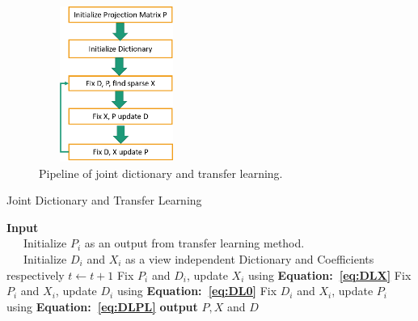 \begin{figure}[hbt!]
	\centering
	\includegraphics[width=2in,height=2in]{figures/novelpipeline}
	\linebreak
	\caption{Pipeline of joint dictionary and transfer learning.}
	\label{fig1:novelpipeline}
\end{figure}  
\begin{algorithm}
	\caption{Joint Dictionary and Transfer Learning}
	\begin{algorithmic}[1]
		\State \textbf{Input}\\
		~~~Initialize $P_i$ as an output from transfer learning method.\\
		~~~Initialize $D_i$ and $X_i$ as a view independent Dictionary and Coefficients respectively 
		\State $t \leftarrow t+1$
		\State Fix $P_i$ and $D_i$, update $X_i$  using \textbf{Equation:~\eqref{eq:DLX}}
		\State Fix $P_i$ and $X_i$, update $D_i$ using \textbf{Equation:~\eqref{eq:DL0}}
		\State Fix $D_i$ and $X_i$, update $P_i$  using \textbf{Equation:~\eqref{eq:DLPL}}
		\EndWhile\label{euclidendwhile}
		\State \textbf{output} $P, X$ and $D$
	\end{algorithmic}
\label{alg:JDTL}
\end{algorithm}
\noindent

